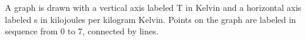 A graph is drawn with a vertical axis labeled T in Kelvin and a horizontal axis labeled s in kilojoules per kilogram Kelvin. Points on the graph are labeled in sequence from 0 to 7, connected by lines.